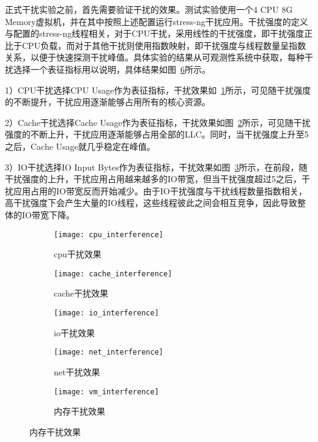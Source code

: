 正式干扰实验之前，首先需要验证干扰的效果。测试实验使用一个4 CPU 8G Memory虚拟机，并在其中按照上述配置运行stress-ng干扰应用。干扰强度的定义与配置的stress-ng线程相关，对于CPU干扰，采用线性的干扰强度，即干扰强度正比于CPU负载，而对于其他干扰则使用指数映射，即干扰强度与线程数量呈指数关系，以便于快速探测干扰峰值。具体实验的结果从可观测性系统中获取，每种干扰选择一个表征指标用以说明，具体结果如图~\ref{fig:interference}所示。

1）CPU干扰选择CPU Usage作为表征指标，干扰效果如~\ref{fig:cpu_interference}所示，可见随干扰强度的不断提升，干扰应用逐渐能够占用所有的核心资源。

2）Cache干扰选择Cache Usage作为表征指标，干扰效果如图~\ref{fig:cache_interference}所示，可见随干扰强度的不断上升，干扰应用逐渐能够占用全部的LLC。同时，当干扰强度上升至5之后，Cache Usage就几乎稳定在峰值。

3）IO干扰选择IO Input Bytes作为表征指标，干扰效果如图~\ref{fig:io_interference}所示，在前段，随干扰强度的上升，干扰应用占用越来越多的IO带宽，但当干扰强度超过5之后，干扰应用占用的IO带宽反而开始减少。由于IO干扰强度与干扰线程数量指数相关，高干扰强度下会产生大量的IO线程，这些线程彼此之间会相互竞争，因此导致整体的IO带宽下降。

\begin{figure}[H]
  \centering
  \begin{subfigure}[b]{0.45\textwidth}
    \texttt{[image: cpu\_interference]}
    \caption{cpu干扰效果}
    \label{fig:cpu_interference}
  \end{subfigure}
  \begin{subfigure}[b]{0.45\textwidth}
    \texttt{[image: cache\_interference]}
    \caption{cache干扰效果}
    \label{fig:cache_interference}
  \end{subfigure}
  \begin{subfigure}[b]{0.45\textwidth}
    \texttt{[image: io\_interference]}
    \caption{io干扰效果}
    \label{fig:io_interference}
  \end{subfigure}
  \begin{subfigure}[b]{0.45\textwidth}
    \texttt{[image: net\_interference]}
    \caption{net干扰效果}
    \label{fig:net_interference}
  \end{subfigure}
  \caption{干扰效果}
  \begin{subfigure}[b]{0.45\textwidth}
    \texttt{[image: vm\_interference]}
    \caption{内存干扰效果}
    \label{fig:vm_interference}
  \end{subfigure}
  \label{fig:interference}
\end{figure}

